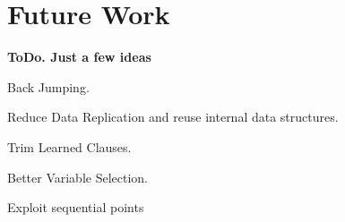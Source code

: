 \chapter{Future Work}

\textbf{ToDo. Just a few ideas}

Back Jumping.

Reduce Data Replication and reuse internal data structures.

Trim Learned Clauses.

Better Variable Selection.

Exploit sequential points
